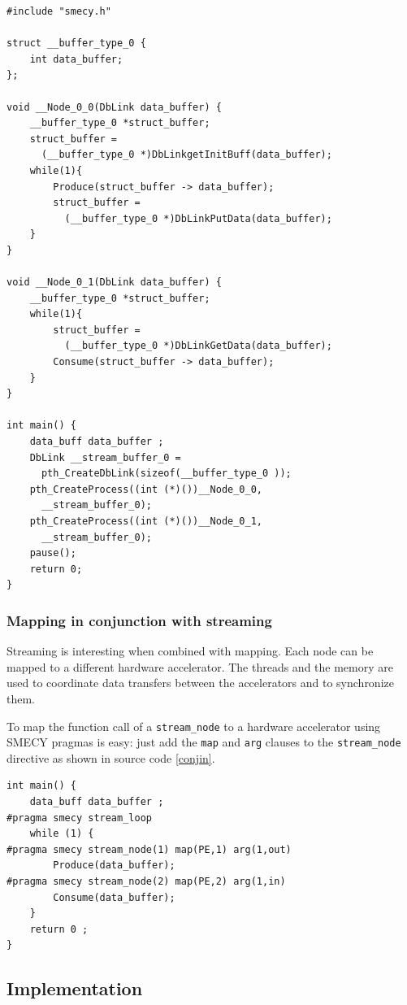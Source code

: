 \documentclass[a4paper]{article}
\begin{document}
	\begin{lstlisting}[label=streamoutput,caption={Possible output
code. The definitions of \texttt{Produce} and \texttt{Consume} functions are not shown.}]
#include "smecy.h" 

struct __buffer_type_0 {
	int data_buffer;
};

void __Node_0_0(DbLink data_buffer) {
	__buffer_type_0 *struct_buffer;
	struct_buffer =
	  (__buffer_type_0 *)DbLinkgetInitBuff(data_buffer);
	while(1){
		Produce(struct_buffer -> data_buffer);
		struct_buffer = 
		  (__buffer_type_0 *)DbLinkPutData(data_buffer);
	}
}

void __Node_0_1(DbLink data_buffer) {
	__buffer_type_0 *struct_buffer;
	while(1){
		struct_buffer = 
		  (__buffer_type_0 *)DbLinkGetData(data_buffer);
		Consume(struct_buffer -> data_buffer);
	}
}

int main() {
	data_buff data_buffer ;
	DbLink __stream_buffer_0 = 
	  pth_CreateDbLink(sizeof(__buffer_type_0 ));
	pth_CreateProcess((int (*)())__Node_0_0,
	  __stream_buffer_0);
	pth_CreateProcess((int (*)())__Node_0_1,
	  __stream_buffer_0);
	pause();
	return 0;
}
	\end{lstlisting}
	
	\subsubsection{Mapping in conjunction with streaming}
	Streaming is interesting when combined with mapping. Each node can be mapped to a different hardware accelerator. The threads and the memory are used to coordinate data transfers between the accelerators and to synchronize them.
	
	To map the function call of a \verb+stream_node+ to a hardware accelerator using SMECY pragmas is easy: just add the \verb+map+ and \verb+arg+ clauses to the \verb+stream_node+ directive as shown in source code \ref{conjin}.
		
	\begin{lstlisting}[label=conjin,caption={Input code with streaming and
mapping pragmas. The definitions of \texttt{Produce} and \texttt{Consume} functions are not shown.}]
int main() {
	data_buff data_buffer ;
#pragma smecy stream_loop
	while (1) {
#pragma smecy stream_node(1) map(PE,1) arg(1,out)
		Produce(data_buffer);
#pragma smecy stream_node(2) map(PE,2) arg(1,in)
		Consume(data_buffer);
	}
	return 0 ;
}
	\end{lstlisting}

	
	\subsection{Implementation}
	
\end{document}
